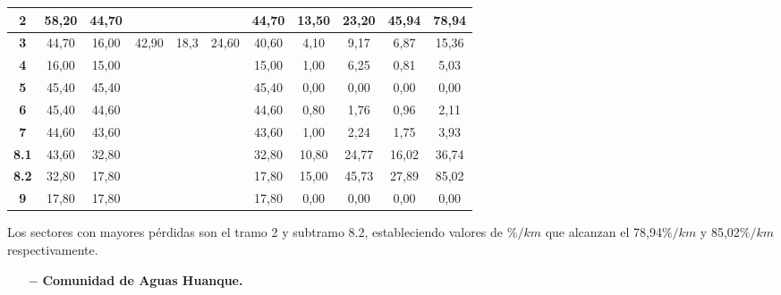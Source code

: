 \documentclass[]{article}
\begin{document}
\begin{landscape}
\begin{table}[H]
{\begin{tabular}{|c|c|c|c|c|c|c|c|c|c|c|}
\textbf{2} & 58,20 & 44,70 & & & & 44,70 & 13,50 & 23,20 & 45,94 & 78,94  \\ \hline
\textbf{3} & 44,70 & 16,00 & 42,90 & 18,3 & 24,60 & 40,60 & 4,10 & 9,17 & 6,87 & 15,36  \\ \hline
\textbf{4} & 16,00 & 15,00 & & & & 15,00 & 1,00 & 6,25 & 0,81 & 5,03  \\ \hline
\textbf{5} & 45,40 & 45,40 & & & & 45,40 & 0,00 & 0,00 & 0,00 & 0,00 \\ \hline
\textbf{6} & 45,40 & 44,60 & & & & 44,60 & 0,80 & 1,76 & 0,96 & 2,11  \\ \hline
\textbf{7} & 44,60 & 43,60 & & & & 43,60 & 1,00 & 2,24 & 1,75 & 3,93  \\ \hline
\textbf{8.1} & 43,60 & 32,80 & & & & 32,80 & 10,80 & 24,77 & 16,02 & 36,74  \\ \hline
\textbf{8.2} & 32,80 & 17,80 & & & & 17,80 & 15,00 & 45,73 & 27,89 & 85,02  \\ \hline
\textbf{9} & 17,80 & 17,80 & & & & 17,80 & 0,00 & 0,00 & 0,00 & 0,00  \\ \hline 
\end{tabular}
}
\end{table}

Los sectores con mayores pérdidas son el tramo 2 y subtramo 8.2, estableciendo valores de $\%/km$ que alcanzan el 78,94$\%/km$ y 85,02$\%/km$ respectivamente.


\begin{itemize}
	\item[$-$] \textbf{Comunidad de Aguas Huanque.}
\end{itemize}


\end{landscape}
\end{document}
